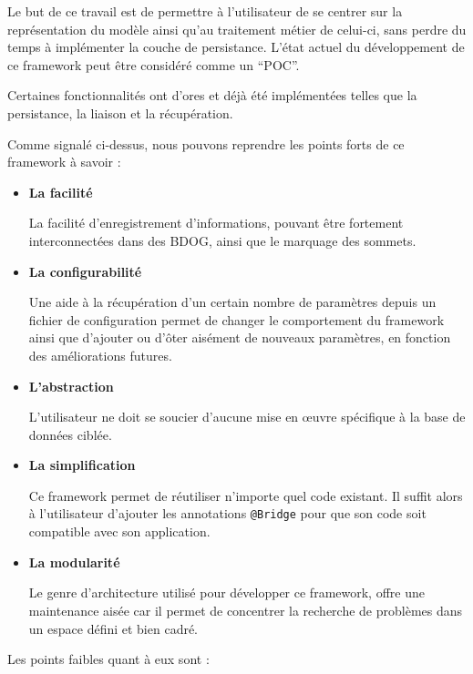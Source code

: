 \documentclass[a4paper,fleqn,12pt,oneside]{report}
\begin{document}
Le but de ce travail est de permettre à l'utilisateur de se centrer sur la représentation du modèle ainsi qu'au traitement métier de celui-ci, sans perdre du temps à implémenter la couche de persistance. L'état actuel du développement de ce framework peut être considéré comme un \enquote{POC}.

Certaines fonctionnalités ont d'ores et déjà été implémentées telles que la persistance, la liaison et la récupération.

Comme signalé ci-dessus, nous pouvons reprendre les points forts de ce framework à savoir :

\begin{itemize}
\item \textbf{La facilité}

\quad La facilité d'enregistrement d'informations, pouvant être fortement interconnectées dans des BDOG, ainsi que le marquage des sommets.

\item \textbf{La configurabilité}

\quad Une aide à la récupération d'un certain nombre de paramètres depuis un fichier de configuration permet de changer le comportement du framework ainsi que d’ajouter ou d’ôter aisément de nouveaux paramètres, en fonction des améliorations futures.

\item \textbf{L'abstraction}

\quad L'utilisateur ne doit se soucier d'aucune mise en œuvre spécifique à la base de données ciblée. 

\item \textbf{La simplification}

\quad Ce framework permet de réutiliser n'importe quel code existant. Il suffit alors à l'utilisateur d'ajouter les annotations \texttt{@Bridge} pour que son code soit compatible avec son application.

\item \textbf{La modularité}

\quad Le genre d'architecture utilisé pour développer ce framework, offre une maintenance aisée car il permet de concentrer la recherche de problèmes dans un espace défini et bien cadré.

\end{itemize}
\newpage
Les points faibles quant à eux sont :
\end{document}
